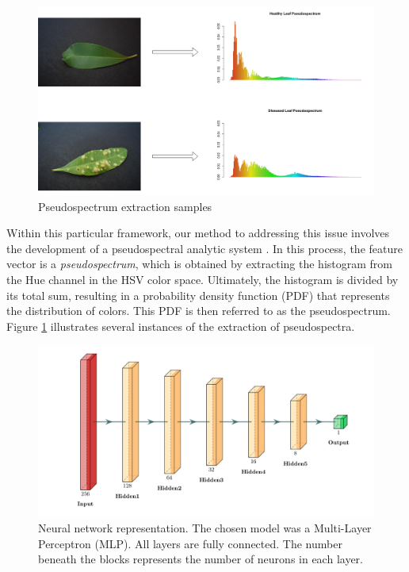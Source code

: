 \begin{figure}[h]
    \centering
    \includegraphics[width=.9\linewidth]{Figures/pseudospectrum-distribution.png}
    \caption{Pseudospectrum extraction samples}
    \label{fig:pseudospectrum}
\end{figure}

Within this particular framework, our method to addressing this issue involves the development of a pseudospectral analytic system \cite{iceis21orange}. In this process, the feature vector is a \textit{pseudospectrum}, which is obtained by extracting the histogram from the Hue channel in the HSV color space. Ultimately, the histogram is divided by its total sum, resulting in a probability density function (PDF) that represents the distribution of colors. This PDF is then referred to as the pseudospectrum. Figure \ref{fig:pseudospectrum} illustrates several instances of the extraction of pseudospectra.

\begin{figure}[h!]
    \centering
    \includegraphics[width = .7\linewidth]{Figures/neuralnetwork-1.png}
    \caption{\color{black}Neural network representation. The chosen model was a Multi-Layer Perceptron (MLP). All layers are fully connected. The number beneath the blocks represents the number of neurons in each layer.}
    \label{fig:neural-network}
\end{figure}

